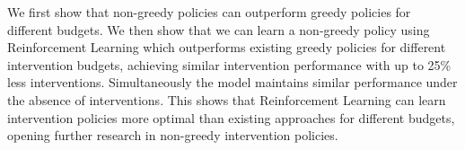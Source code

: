We first show that non-greedy policies can outperform 
greedy policies for different budgets.
We then show that we can learn a non-greedy policy using Reinforcement Learning which outperforms
existing greedy policies for different intervention budgets, achieving 
similar intervention performance with up to 25\% less interventions.
Simultaneously the model maintains similar 
performance under the absence of interventions.
This shows that Reinforcement Learning can
 learn intervention policies more optimal than
existing approaches for different budgets, 
opening further research in non-greedy intervention policies.


